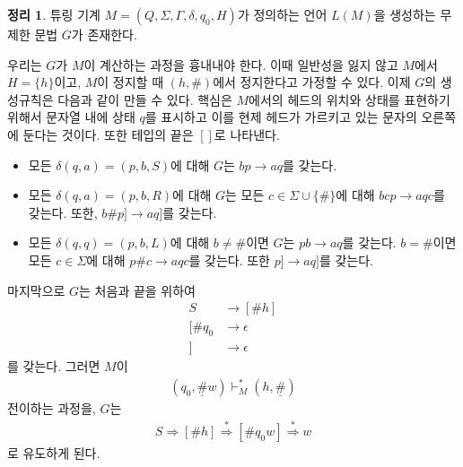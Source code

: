 \documentclass[b5paper, 11pt]{book}
\theoremstyle{definition}
\newtheorem{thm}[defn]{정리}
\newenvironment{pf*}{\pushQED{\qed}\pf}
{\popQED\endpf}
\begin{document}
\begin{thm}
    튜링 기계 $M = (Q, \Sigma, \Gamma, \delta, q_0, H)$가 정의하는 언어 $L(M)$을 생성하는 무제한 문법 $G$가 존재한다.
\end{thm}
\begin{pf*}
    우리는 $G$가 $M$이 계산하는 과정을 흉내내야 한다. 이때 일반성을 잃지 않고 $M$에서 $H = \{h\}$이고, $M$이 정지할 때 $(h, \#)$에서 정지한다고 가정할 수 있다. 이제 $G$의 생성규칙은 다음과 같이 만들 수 있다. 핵심은 $M$에서의 헤드의 위치와 상태를 표현하기 위해서 문자열 내에 상태 $q$를 표시하고 이를 현제 헤드가 가르키고 있는 문자의 오른쪽에 둔다는 것이다. 또한 테입의 끝은 $[]$로 나타낸다.
    \begin{itemize}
        \item 모든 $\delta(q, a) = (p, b, S)$에 대해 $G$는 $bp \rightarrow
        aq$를 갖는다.
        \item 모든 $\delta(q, a) = (p, b, R)$에 대해 $G$는 모든 $c \in \Sigma 
        \cup \{\#\}$에 대해 $bcp \rightarrow aqc$를 갖는다. 또한, $b\# p] \rightarrow
        aq]$를 갖는다.
        \item 모든 $\delta(q, q) = (p, b, L)$에 대해 $b \neq \#$이면 
        $G$는 $pb \rightarrow aq$를 갖는다. $b = \#$이면 모든 $c \in \Sigma$에 대해
        $p\# c \rightarrow aqc$를 갖는다. 또한 $p] \rightarrow aq]$를 갖는다. 
    \end{itemize}
    마지막으로 $G$는 처음과 끝을 위하여
    \begin{align*}
        S &\rightarrow [\# h] \\ 
        [\#q_0 &\rightarrow \epsilon \\ 
        ] &\rightarrow \epsilon
    \end{align*}
    를 갖는다. 그러면 $M$이 
    \begin{align*}
        (q_0, \underline{\#}w) \vdash_M^* (h, \underline{\#})
    \end{align*}
    전이하는 과정을, $G$는 
    \begin{align*}
        S \Rightarrow [\# h] \overset{*}{\Rightarrow} [\#q_0 w] 
        \overset{*}{\Rightarrow} w
    \end{align*}
    로 유도하게 된다. 
\end{pf*}
\end{document}
